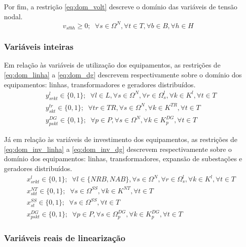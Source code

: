 Por fim, a restrição \eqref{eq:dom_volt} descreve o domínio das variáveis de tensão nodal.
\begin{equation}
    v_{stbh} \geq 0; \; \; \forall s \in \Omega^N, \forall t \in T, \forall b \in B , \forall h \in H \label{eq:dom_volt}
\end{equation}

\subsubsection*{Variáveis inteiras}

Em relação às variáveis de utilização dos equipamentos, as restrições de \eqref{eq:dom_linha} a \eqref{eq:dom_dg} descrevem respectivamente sobre o domínio dos equipamentos: linhas, transformadores e geradores distribuídos.
\begin{align}
    &y^l_{srkt} \in \{0, 1\}; \; \; \forall l \in L, \forall s \in \Omega^N, \forall r \in \Omega^l_s, \forall k \in K^l, \forall t \in T \label{eq:dom_linha}\\
    &y^{tr}_{skt} \in \{0, 1\}; \; \; \forall tr \in TR, \forall s \in \Omega^{N}, \forall k \in K^{TR}, \forall t \in T\\
    &y^{DG}_{pskt} \in \{0, 1\}; \; \; \forall p \in P, \forall s \in \Omega^{N}, \forall k \in K^{DG}_p, \forall t \in T \label{eq:dom_dg}
\end{align}

Já em relação às variáveis de investimento dos equipamentos, as restrições de \eqref{eq:dom_inv_linha} a \eqref{eq:dom_inv_dg} descrevem respectivamente sobre o domínio dos equipamentos: linhas, transformadores, expansão de subestações e geradores distribuídos.
\begin{align}
    &x^l_{srkt} \in \{0, 1\}; \; \; \forall l \in \{NRB, NAB\}, \forall s \in \Omega^N, \forall r \in \Omega^l_s, \forall k \in K^l, \forall t \in T \label{eq:dom_inv_linha}\\
    &x^{NT}_{skt} \in \{0, 1\}; \; \; \forall s \in \Omega^{SS}, \forall k \in K^{NT}, \forall t \in T\\
    &x^{SS}_{st} \in \{0, 1\}; \; \; \forall s \in \Omega^{SS}, \forall t \in T\\
    &x^{DG}_{pskt} \in \{0, 1\}; \; \; \forall p \in P, \forall s \in \Omega^{DG}_p, \forall k \in K^{DG}_p, \forall t \in T \label{eq:dom_inv_dg}
\end{align}

\subsubsection*{Variáveis reais de linearização}

